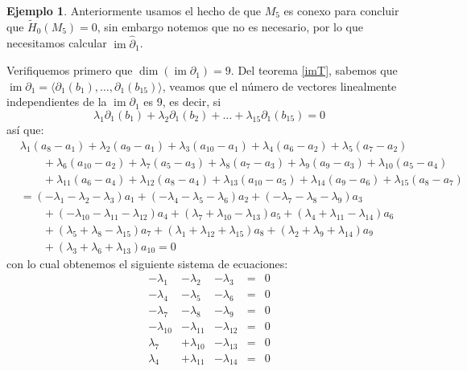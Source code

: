 \documentclass[12pt]{book}
\theoremstyle{definition}
\newtheorem{example}[theorem]{Ejemplo}
\DeclareMathOperator{\im}{im}
\newcounter{in}
\begin{document}
\begin{example}
Anteriormente usamos el hecho de que $M_{5}$ es conexo para concluir que $\widetilde
H_{0}(M_{5})=0$, sin embargo notemos que no es necesario, por lo que
necesitamos calcular $\im \widehat\partial_{1}$. 

Verifiquemos primero que $\dim(\im \partial_{1})=9$. Del teorema
\ref{imT}, sabemos que
$\im \partial_{1}=\langle\partial_{1}(b_{1}),\ldots,\partial_{1}(b_{15})\rangle$,
veamos que el número de vectores linealmente independientes de la
$\im \partial_{1}$ es 9, es
decir, si
$$\lambda_{1}\partial_{1}(b_{1})+\lambda_{2}\partial_{1}(b_{2})+\ldots+\lambda_{15}\partial_{1}(b_{15})=0$$
así que:
\begin{align*}
  &\lambda_{1}(a_{8}-a_{1})+\lambda_{2}(a_{9}-a_{1})+\lambda_{3}(a_{10}-a_{1})+\lambda_{4}(a_{6}-a_{2})+\lambda_{5}(a_{7}-a_{2})\\
  &\qquad
  {}+\lambda_{6}(a_{10}-a_{2})+\lambda_{7}(a_{5}-a_{3})+\lambda_{8}(a_{7}-a_{3})+\lambda_{9}(a_{9}-a_{3})+\lambda_{10}(a_{5}-a_{4})\\
  &\qquad{}+\lambda_{11}(a_{6}-a_{4})+\lambda_{12}(a_{8}-a_{4})+\lambda_{13}(a_{10}-a_{5})+\lambda_{14}(a_{9}-a_{6})+\lambda_{15}(a_{8}-a_{7})\\
  &=(-\lambda_{1}-\lambda_{2}-\lambda_{3})a_{1}+(-\lambda_{4}-\lambda_{5}-\lambda_{6})a_{2}+(-\lambda_{7}-\lambda_{8}-\lambda_{9})a_{3}\\
  &\qquad{}+(-\lambda_{10}-\lambda_{11}-\lambda_{12})a_{4}+(\lambda_{7}+\lambda_{10}-\lambda_{13})a_{5}+(\lambda_{4}+\lambda_{11}-\lambda_{14})a_{6}\\
  &\qquad{}+(\lambda_{5}+\lambda_{8}-\lambda_{15})a_{7}+(\lambda_{1}+\lambda_{12}+\lambda_{15})a_{8}+(\lambda_{2}+\lambda_{9}+\lambda_{14})a_{9}\\
  &\qquad{}+(\lambda_{3}+\lambda_{6}+\lambda_{13})a_{10}=0
\end{align*}
con lo cual obtenemos el siguiente sistema de ecuaciones:
 \[\begin{array}{rrrrr}
   -\lambda_{1} & -\lambda_{2} & -\lambda_{3} & = & 0 \\
   -\lambda_{4} & -\lambda_{5} & -\lambda_{6} & = & 0 \\
   -\lambda_{7} & -\lambda_{8} & -\lambda_{9} & = & 0 \\
   -\lambda_{10} & -\lambda_{11} & -\lambda_{12} & = & 0 \\
   \lambda_{7} & +\lambda_{10} & -\lambda_{13} & = & 0 \\
   \lambda_{4} & +\lambda_{11} & -\lambda_{14} & = & 0 \\

\end{array}\]
\end{example}
\end{document}

